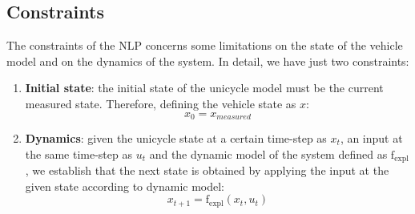 \subsection{Constraints}
The constraints of the NLP concerns some limitations on the state of the vehicle model 
and on the dynamics of the system. 
In detail, we have just two constraints:
\begin{enumerate}
    \item \textbf{Initial state}: the initial state of the unicycle model must be the current measured state. 
                                  Therefore, defining the vehicle state as $x$:
                                  \begin{equation}
                                    x_0 = x_{measured}
                                  \end{equation}
    \item \textbf{Dynamics}: given the unicycle state at a certain time-step as $x_t$, an input at the same time-step as $u_t$
                             and the dynamic model of the system defined as $\text{f}_\text{expl}$, 
                             we establish that the next state is obtained by applying the input at the given state according to
                             dynamic model:
                             \begin{equation}
                                x_{t+1} = \text{f}_\text{expl}(x_t, u_t)
                             \end{equation} 
\end{enumerate}

